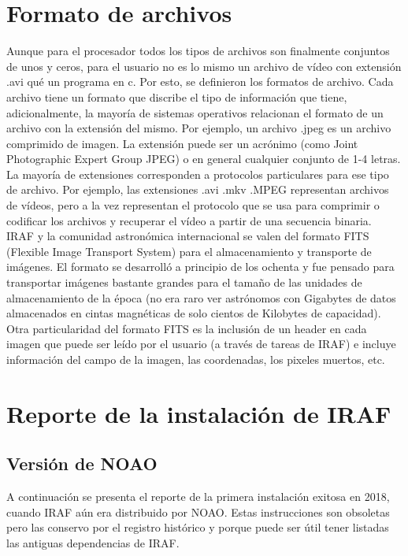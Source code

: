 \documentclass[12pt]{article}
\begin{document}
\section{Formato de archivos}
Aunque para el procesador todos los tipos de archivos son finalmente conjuntos de unos y ceros, para el usuario no es lo mismo un archivo de vídeo con extensión .avi qué un programa en c. Por esto, se definieron los formatos de archivo. Cada archivo tiene un formato que discribe el tipo de información que tiene, adicionalmente, la mayoría de sistemas operativos relacionan el formato de un archivo con la extensión del mismo. Por ejemplo, un archivo .jpeg es un archivo comprimido de imagen. La extensión puede ser un acrónimo (como Joint Photographic Expert Group JPEG) o en general cualquier conjunto de 1-4 letras. La mayoría de extensiones corresponden a protocolos particulares para ese tipo de archivo. Por ejemplo, las extensiones .avi .mkv .MPEG representan archivos de vídeos, pero a la vez representan el protocolo que se usa para comprimir o codificar los archivos y recuperar el vídeo a partir de una secuencia binaria.\\
IRAF y la comunidad astronómica internacional se valen del formato FITS (Flexible Image Transport System) para el almacenamiento y transporte de imágenes. El formato se desarrolló a principio de los ochenta y fue pensado para transportar imágenes bastante grandes para el tamaño de las unidades de almacenamiento de la época (no era raro ver astrónomos con Gigabytes de datos almacenados en cintas magnéticas de solo cientos de Kilobytes de capacidad). Otra particularidad del formato FITS es la inclusión de un header en cada imagen que puede ser leído por el usuario (a través de tareas de IRAF) e incluye información del campo de la imagen, las coordenadas, los pixeles muertos, etc. 


\section{Reporte de la instalación de IRAF}

\subsection{Versión de NOAO}
A continuación se presenta el reporte de la primera instalación exitosa en 2018, cuando IRAF aún era distribuido por NOAO.
Estas instrucciones son obsoletas pero las conservo por el registro histórico y porque puede ser útil tener listadas las antiguas dependencias de IRAF.
\end{document}
